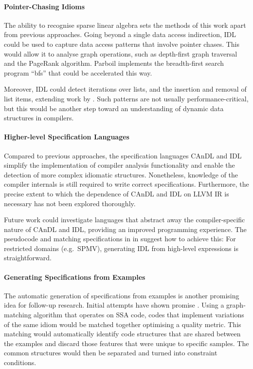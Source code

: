 \paragraph*{Pointer-Chasing Idioms}

    The ability to recognise sparse linear algebra sets the methods of this
    work apart from previous approaches.
    Going beyond a single data access indirection, IDL could be used to capture
    data access patterns that involve pointer chases.
    This would allow it to analyse graph operations, such as depth-first graph
    traversal and the PageRank algorithm.
    Parboil implements the breadth-first search program ``bfs'' that could be
    accelerated this way.

    Moreover, IDL could detect iterations over lists, and the insertion and
    removal of list items, extending work by
    \citet{Manilov:2018:GPI:3178372.3179511}.
    Such patterns are not usually performance-critical, but this would be
    another step toward an understanding of dynamic data structures in compilers.

    \paragraph*{Higher-level Specification Languages}
    Compared to previous approaches, the specification languages CAnDL and IDL
    simplify the implementation of compiler analysis functionality and enable
    the detection of more complex idiomatic structures.
    Nonetheless, knowledge of the compiler internals is still required to write
    correct specifications.
    Furthermore, the precise extent to which the dependence of CAnDL and IDL on
    LLVM IR is necessary has not been explored thoroughly.

    Future work could investigate languages that abstract away the
    compiler-specific nature of CAnDL and IDL, providing an improved programming
    experience.
    The pseudocode and matching specifications in
     in  suggest
    how to achieve this:
    For restricted domains (e.g.\ SPMV), generating IDL from high-level
    expressions is straightforward.

    \paragraph*{Generating Specifications from Examples}
    The automatic generation of specifications from examples is another
    promising idea for follow-up research.
    Initial attempts have shown promise \citep{DBLP:conf/IEEEpact/CollieGO19}.
    Using a graph-matching algorithm that operates on SSA code, codes that
    implement variations of the same idiom would be matched together optimising
    a quality metric.
    This matching would automatically identify code structures that are shared
    between the examples and discard those features that were unique to
    specific samples.
    The common structures would then be separated and turned into constraint
    conditions.

